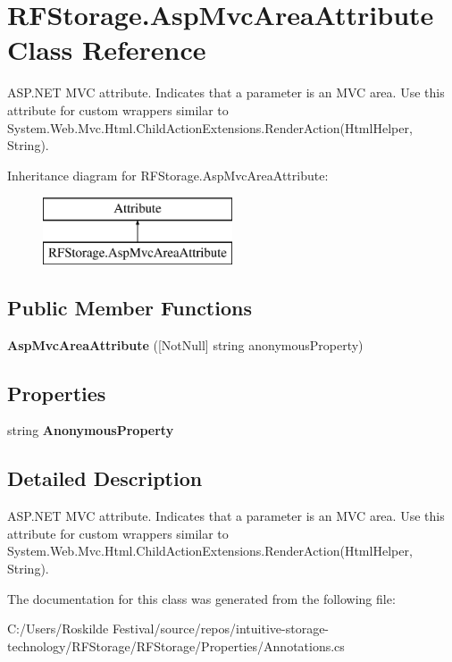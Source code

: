 \section{R\+F\+Storage.\+Asp\+Mvc\+Area\+Attribute Class Reference}
\label{class_r_f_storage_1_1_asp_mvc_area_attribute}


A\+S\+P.\+N\+ET M\+VC attribute. Indicates that a parameter is an M\+VC area. Use this attribute for custom wrappers similar to {\ttfamily System.\+Web.\+Mvc.\+Html.\+Child\+Action\+Extensions.\+Render\+Action(\+Html\+Helper, String)}.  


Inheritance diagram for R\+F\+Storage.\+Asp\+Mvc\+Area\+Attribute\+:\begin{figure}[H]
\begin{center}
\leavevmode
\includegraphics[height=2.000000cm]{class_r_f_storage_1_1_asp_mvc_area_attribute}
\end{center}
\end{figure}
\subsection*{Public Member Functions}
\begin{DoxyCompactItemize}
\item 
\mbox{\label{class_r_f_storage_1_1_asp_mvc_area_attribute_ade663f3abec301cd185099f54427df44}} 
{\bfseries Asp\+Mvc\+Area\+Attribute} ([Not\+Null] string anonymous\+Property)
\end{DoxyCompactItemize}
\subsection*{Properties}
\begin{DoxyCompactItemize}
\item 
\mbox{\label{class_r_f_storage_1_1_asp_mvc_area_attribute_ac8c45a8ce481b9404005ed64f87fe9ee}} 
string {\bfseries Anonymous\+Property}\hspace{0.3cm}{\ttfamily  [get]}
\end{DoxyCompactItemize}


\subsection{Detailed Description}
A\+S\+P.\+N\+ET M\+VC attribute. Indicates that a parameter is an M\+VC area. Use this attribute for custom wrappers similar to {\ttfamily System.\+Web.\+Mvc.\+Html.\+Child\+Action\+Extensions.\+Render\+Action(\+Html\+Helper, String)}. 



The documentation for this class was generated from the following file\+:\begin{DoxyCompactItemize}
\item 
C\+:/\+Users/\+Roskilde Festival/source/repos/intuitive-\/storage-\/technology/\+R\+F\+Storage/\+R\+F\+Storage/\+Properties/Annotations.\+cs\end{DoxyCompactItemize}
